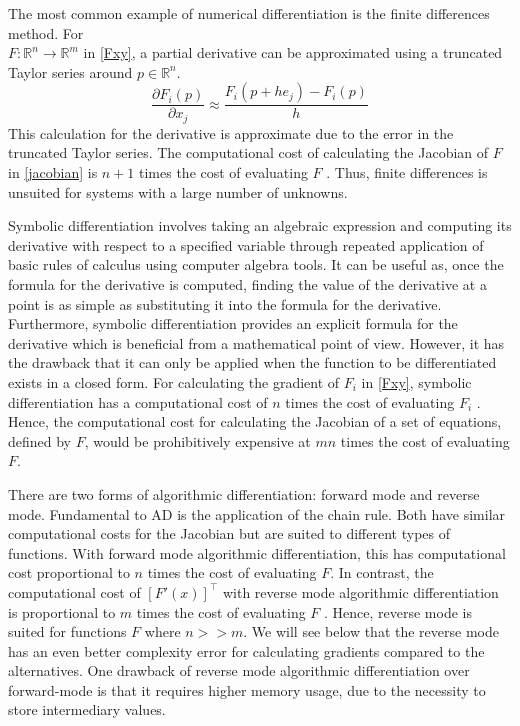 \documentclass{article}
\begin{document}
The most common example of numerical differentiation is the finite differences method. For \\ $F: \mathbb{R}^n \longrightarrow \mathbb{R}^m$ in \eqref{Fxy}, a partial derivative can be approximated using a truncated Taylor series around $p \in \mathbb{R}^n$. 
\begin{equation}
    \frac{\partial F_i (p)}{\partial x_j} \approx \frac{F_i(p+he_j) - F_i(p)}{h}
\end{equation}
This calculation for the derivative is approximate due to the error in the truncated Taylor series. The computational cost of calculating the Jacobian of $F$ in \eqref{jacobian} is $n + 1$ times the cost of evaluating $F$ \cite{chem}. Thus, finite differences is unsuited for systems with a large number of unknowns.

Symbolic differentiation involves taking an algebraic expression and computing its derivative with respect to a specified variable through repeated application of basic rules of calculus using computer algebra tools. It can be useful as, once the formula for the derivative is computed, finding the value of the derivative at a point is as simple as substituting it into the formula for the derivative.  Furthermore, symbolic differentiation provides an explicit formula for the derivative which is beneficial from a mathematical point of view. However, it has the drawback that it can only be applied when the function to be differentiated exists in a closed form. For calculating the gradient of $F_i$ in \eqref{Fxy}, symbolic differentiation has a computational cost of $n$ times the cost of evaluating $F_i$ \cite{chem}. Hence, the computational cost for calculating the Jacobian of a set of equations, defined by $F$, would be prohibitively expensive at $mn$ times the cost of evaluating $F$.

There are two forms of algorithmic differentiation: forward mode and reverse mode. Fundamental to AD is the application of the chain rule. Both have similar computational costs for the Jacobian but are suited to different types of functions. With forward mode algorithmic differentiation, this has computational cost proportional to $n$ times the cost of evaluating $F$. In contrast, the computational cost of $[F'(x)]^\top$ with reverse mode algorithmic differentiation is proportional to $m$ times the cost of evaluating $F$ \cite{falisse}. Hence, reverse mode is suited for functions $F$ where $n >> m$. We will see below that the reverse mode has an even better complexity error for calculating gradients compared to the alternatives. One drawback of reverse mode algorithmic differentiation over forward-mode is that it requires higher memory usage, due to the necessity to store intermediary values.
\end{document}

